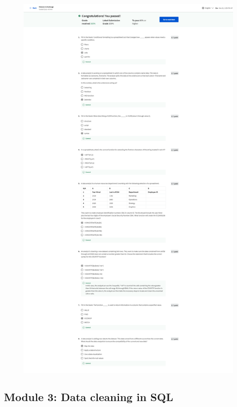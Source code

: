 \documentclass[]{article}
\begin{document}
\begin{figure}
  \centering
  \includegraphics[height=\textheight,keepaspectratio]{image/module_2.png}
\end{figure}

\pagebreak

\subsection{Module 3: Data cleaning in SQL}
\end{document}
